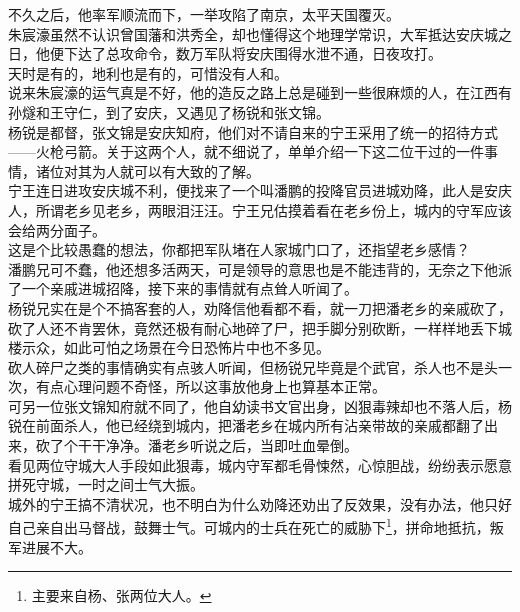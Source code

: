 \begin{multicols}{\theparacolNo}
不久之后，他率军顺流而下，一举攻陷了南京，太平天国覆灭。\\

朱宸濠虽然不认识曾国藩和洪秀全，却也懂得这个地理学常识，大军抵达安庆城之日，他便下达了总攻命令，数万军队将安庆围得水泄不通，日夜攻打。\\

天时是有的，地利也是有的，可惜没有人和。\\

说来朱宸濠的运气真是不好，他的造反之路上总是碰到一些很麻烦的人，在江西有孙燧和王守仁，到了安庆，又遇见了杨锐和张文锦。\\

杨锐是都督，张文锦是安庆知府，他们对不请自来的宁王采用了统一的招待方式——火枪弓箭。关于这两个人，就不细说了，单单介绍一下这二位干过的一件事情，诸位对其为人就可以有大致的了解。\\

宁王连日进攻安庆城不利，便找来了一个叫潘鹏的投降官员进城劝降，此人是安庆人，所谓老乡见老乡，两眼泪汪汪。宁王兄估摸着看在老乡份上，城内的守军应该会给两分面子。\\

这是个比较愚蠢的想法，你都把军队堵在人家城门口了，还指望老乡感情？\\

潘鹏兄可不蠢，他还想多活两天，可是领导的意思也是不能违背的，无奈之下他派了一个亲戚进城招降，接下来的事情就有点耸人听闻了。\\

杨锐兄实在是个不搞客套的人，劝降信他看都不看，就一刀把潘老乡的亲戚砍了，砍了人还不肯罢休，竟然还极有耐心地碎了尸，把手脚分别砍断，一样样地丢下城楼示众，如此可怕之场景在今日恐怖片中也不多见。\\

砍人碎尸之类的事情确实有点骇人听闻，但杨锐兄毕竟是个武官，杀人也不是头一次，有点心理问题不奇怪，所以这事放他身上也算基本正常。\\

可另一位张文锦知府就不同了，他自幼读书文官出身，凶狠毒辣却也不落人后，杨锐在前面杀人，他已经绕到城内，把潘老乡在城内所有沾亲带故的亲戚都翻了出来，砍了个干干净净。潘老乡听说之后，当即吐血晕倒。\\

看见两位守城大人手段如此狠毒，城内守军都毛骨悚然，心惊胆战，纷纷表示愿意拼死守城，一时之间士气大振。\\

城外的宁王搞不清状况，也不明白为什么劝降还劝出了反效果，没有办法，他只好自己亲自出马督战，鼓舞士气。可城内的士兵在死亡的威胁下\footnote{主要来自杨、张两位大人。}，拼命地抵抗，叛军进展不大。\\


\end{multicols}
